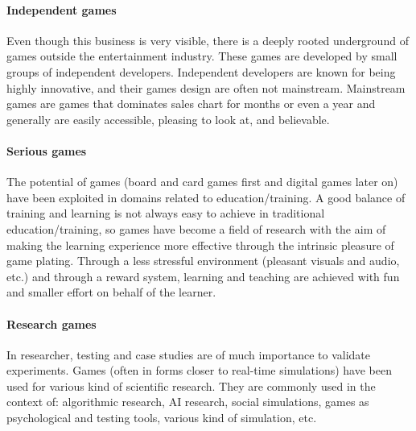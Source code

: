 \documentclass[10pt,a4paper]{article}
\begin{document}
\paragraph{Independent games}
Even though this business is very visible, there is a deeply rooted underground of games outside the entertainment industry. These games are developed by small groups of independent developers. Independent developers are known for being highly innovative, and their games design are often not mainstream. Mainstream games are games that dominates sales chart for months or even a year and generally are easily accessible, pleasing to look at, and believable.

\paragraph{Serious games}
The potential of games (board and card games first and digital games later on) have been exploited in domains related to education/training. A good balance of training and learning is not always easy to achieve in traditional education/training, so games have become a field of research with the aim of making the learning experience more effective through
the intrinsic pleasure of game plating. Through a less stressful environment (pleasant visuals and audio, etc.) and through a reward system, learning and teaching are achieved with fun and smaller effort on behalf of the learner.

\paragraph{Research games}
In researcher, testing and case studies are of much importance to validate experiments. Games (often in forms closer to real-time simulations) have been used for various kind of scientific research. They are commonly used in the context of: algorithmic research, AI research, social simulations, games as psychological and testing tools, various kind of simulation, etc.
\end{document}
